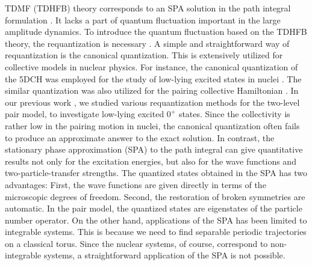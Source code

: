\documentclass[%
superscriptaddress,
showpacs,
nofootinbib,
amsmath,amssymb,
aps,
prc,
twocolumn,
floatfix ]%
{revtex4-1}
\begin{document}
TDMF (TDHFB) theory corresponds to an SPA solution in the path integral
formulation \cite{Neg82}.
It lacks a part of quantum fluctuation
important in the large amplitude dynamics.
To introduce the quantum fluctuation based on the TDHFB theory,
the requantization is necessary \cite{Neg82,L80,LNP80,Rei80,KS80,K81}.
A simple and straightforward way of requantization is
the canonical quantization.
This is extensively utilized for collective models in nuclear physics.
For instance,
the canonical quantization of the 5DCH was employed for the study of low-lying
excited states in nuclei \cite{???}.
The similar quantization was also utilized for the pairing collective
Hamiltonian \cite{BBPK70, GPBW85, ZPPRS99, P07}.
In our previous work \cite{NN18},
we studied various requantization methods for the two-level pair model,
to investigate low-lying excited $0^+$ states.
Since the collectivity is rather low in the pairing motion in nuclei,
the canonical quantization often fails to produce an approximate answer
to the exact solution.
In contrast,
the stationary phase approximation (SPA) to the path integral \cite{SM88} 
can give quantitative results not only for the excitation energies, 
but also for the wave functions and two-particle-transfer strengths.
The quantized states obtained in the SPA has two advantages:
First, the wave functions are given directly in terms of
the microscopic degrees of freedom.
Second, the restoration of broken symmetries are automatic.
In the pair model, the quantized states are eigenstates of the particle number
operator.
On the other hand, applications of the SPA has been limited to
integrable systems.
This is because we need to find separable periodic trajectories on a classical
torus.
Since the nuclear systems, of course, correspond to non-integrable systems,
a straightforward application of the SPA is not possible.
\end{document}
